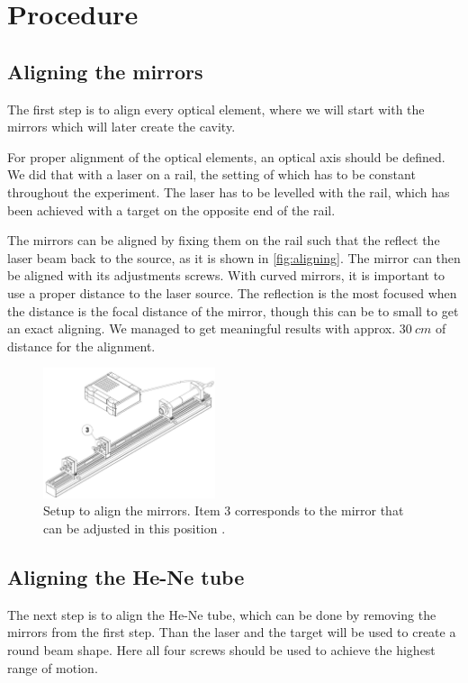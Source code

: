 \section{Procedure}
\label{sec:procedure}

\subsection{Aligning the mirrors}
\label{sec:Aligning the mirrors}
The first step is to align every optical element, where we will start with the mirrors which will
later create the cavity.

For proper alignment of the optical elements, an optical axis should be defined. We did that with a
laser on a rail, the setting of which has to be constant throughout the experiment. The laser has to
be levelled with the rail, which has been achieved with a target on the opposite end of the rail.

The mirrors can be aligned by fixing them on the rail such that the reflect the laser beam back to
the source, as it is shown in \autoref{fig:aligning}. The mirror can then be aligned with its adjustments screws.
With curved mirrors, it is important to use a proper distance to the laser source. The reflection is
the most focused when the distance is the focal distance of the mirror, though this can be to small
to get an exact aligning. We managed to get meaningful results with approx. $\SI{30}{cm}$ of
distance for the alignment.

\begin{figure}
  \centering
  \includegraphics[width=0.45\textwidth]{media/aligning mirrors.png}
  \caption{Setup to align the mirrors. Item 3 corresponds to the mirror that can be adjusted in this
  position \cite{elas_manual}.}
  \label{fig:aligning}
\end{figure}

\subsection{Aligning the He-Ne tube}
\label{sec:Aligning the He-Ne tube}
The next step is to align the He-Ne tube, which can be done by removing the mirrors from the first
step. Than the laser and the target will be used to create a round beam shape. Here all four screws
should be used to achieve the highest range of motion.

